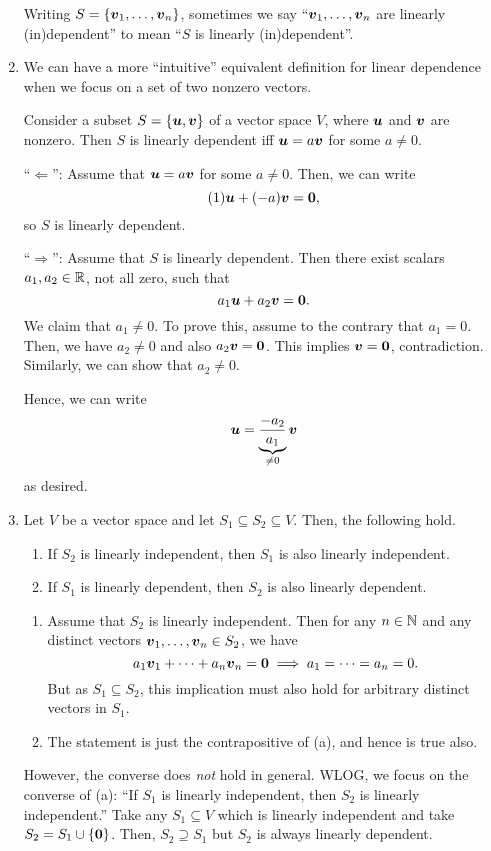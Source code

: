 \begin{enumerate}
\begin{note}
Writing \(S=\{\vb*{v}_1,\dotsc,\vb*{v}_n\}\), sometimes we say
``\(\vb*{v}_1,\dotsc,\vb*{v}_n\) are linearly (in)dependent'' to mean
``\(S\) is linearly (in)dependent''.
\end{note}

\item \label{it:two-nonzero-vec-lin-dep}
We can have a more ``intuitive'' equivalent definition for linear
dependence when we focus on a set of two nonzero vectors.

Consider a subset \(S=\{\vb*{u},\vb*{v}\}\) of a vector space \(V\), where
\(\vb*{u}\) and \(\vb*{v}\) are nonzero. Then \(S\) is linearly dependent iff
\(\vb*{u}=a\vb*{v}\) for some \(a\ne 0\).

\begin{pf}
``\(\Leftarrow\)'': Assume that \(\vb*{u}=a\vb*{v}\) for some \(a\ne 0\).
Then, we can write
\[
(1)\vb*{u}+(-a)\vb*{v}=\vb*{0},
\]
so \(S\) is linearly dependent.

``\(\Rightarrow\)'': Assume that \(S\) is linearly dependent. Then there exist
scalars \(a_1,a_2\in\mathbb{R}\), not all zero, such that
\[
a_1\vb*{u}+a_2\vb*{v}=\vb*{0}.
\]
We claim that \(a_1\ne 0\). To prove this, assume to the contrary that
\(a_1=0\). Then, we have \(a_2\ne 0\) and also \(a_2\vb*{v}=\vb*{0}\). This
implies \(\vb*{v}=\vb*{0}\), contradiction. Similarly, we can show that
\(a_2\ne 0\).

Hence, we can write
\[
\vb*{u}=\underbrace{\frac{-a_2}{a_1}}_{\ne 0}\vb*{v}
\]
as desired.
\end{pf}
\item \label{it:lin-dep-subsets}
Let \(V\) be a vector space and let \(S_1\subseteq S_2\subseteq V\). Then, the
following hold.
\begin{enumerate}
\item If \(S_2\) is linearly independent, then \(S_1\) is also linearly independent.
\item If \(S_1\) is linearly dependent, then \(S_2\) is also linearly
dependent.
\end{enumerate}
\begin{pf}
\begin{enumerate}
\item Assume that \(S_2\) is linearly independent. Then for any \(n\in\mathbb{N}\) and
any distinct vectors \(\vb*{v}_1,\dotsc,\vb*{v}_n\in S_2\), we have
\[
a_1\vb*{v}_1+\dotsb+a_n\vb*{v}_n=\vb*{0}
\implies a_1=\dotsb=a_n=0.
\]
But as \(S_1\subseteq S_2\), this implication must also hold for arbitrary
distinct vectors in \(S_1\).

\item The statement is just the contrapositive of (a), and hence is true also.
\end{enumerate}
\end{pf}

However, the converse does \emph{not} hold in general. WLOG, we focus on the
converse of (a): ``If \(S_1\) is linearly independent, then \(S_2\) is linearly
independent.'' Take any \(S_1\subseteq V\) which is linearly independent and
take \(S_2=S_1\cup\{\vb*{0}\}\).  Then, \(S_2\supseteq S_1\) but \(S_2\) is
always linearly dependent.
\end{enumerate}

